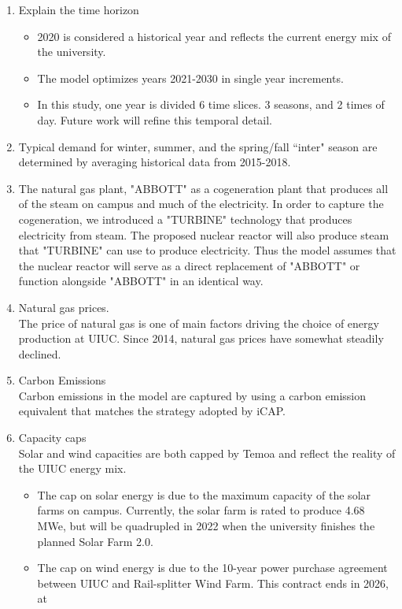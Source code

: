 \begin{enumerate}
  \item Explain the time horizon
  \begin{itemize}
    \item 2020 is considered a historical year and reflects the current energy
    mix of the university.
    \item The model optimizes years 2021-2030 in single year increments.
    \item In this study, one year is divided 6 time slices. 3 seasons, and 2 times
    of day. Future work will refine this temporal detail.
  \end{itemize}
  \item Typical demand for winter, summer, and the spring/fall ``inter" season
  are determined by averaging historical data from 2015-2018.
  \item The natural gas plant, "ABBOTT" as a cogeneration plant that produces
  all of the steam on campus and much of the electricity. In order to capture
  the cogeneration, we introduced a "TURBINE" technology that produces electricity
  from steam. The proposed nuclear reactor will also produce steam that "TURBINE"
  can use to produce electricity. Thus the model assumes that the nuclear reactor
  will serve as a direct replacement of "ABBOTT" or function alongside "ABBOTT"
  in an identical way.
  \item Natural gas prices.\\
  The price of natural gas is one of main factors driving the choice of energy
  production at UIUC. Since 2014, natural gas prices have somewhat steadily declined.
  \item Carbon Emissions \\
  Carbon emissions in the model are captured by using a carbon emission equivalent
  that matches the strategy adopted by iCAP.
  \item Capacity caps\\
  Solar and wind capacities are both capped by Temoa and reflect the reality of
  the UIUC energy mix.
  \begin{itemize}
    \item The cap on solar energy is due to the maximum capacity of the solar
    farms on campus. Currently, the solar farm is rated to produce 4.68 MWe, but
    will be quadrupled in 2022 when the university finishes the planned Solar Farm 2.0.
    \item The cap on wind energy is due to the 10-year power purchase agreement
    between UIUC and Rail-splitter Wind Farm. This contract ends in 2026, at

\end{itemize}
\end{enumerate}
